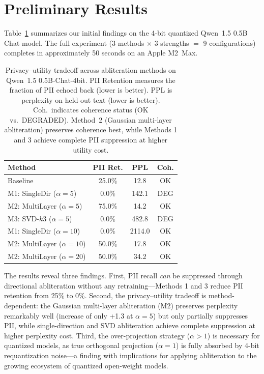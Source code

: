 \documentclass[11pt]{article}
\begin{document}
\section{Preliminary Results}

Table~\ref{tab:results} summarizes our initial findings on the 4-bit quantized Qwen~1.5 0.5B Chat model. The full experiment (3 methods $\times$ 3 strengths $=$ 9 configurations) completes in approximately 50 seconds on an Apple M2~Max.

\begin{table}[t]
\centering
\small
\begin{tabular}{@{}lccc@{}}
\toprule
\textbf{Method} & \textbf{PII Ret.} & \textbf{PPL} & \textbf{Coh.} \\
\midrule
Baseline & 25.0\% & 12.8 & OK \\
\midrule
M1: SingleDir ($\alpha{=}5$) & 0.0\% & 142.1 & DEG \\
M2: MultiLayer ($\alpha{=}5$) & 75.0\% & 14.2 & OK \\
M3: SVD-$k$3 ($\alpha{=}5$) & 0.0\% & 482.8 & DEG \\
\midrule
M1: SingleDir ($\alpha{=}10$) & 0.0\% & 2114.0 & OK \\
M2: MultiLayer ($\alpha{=}10$) & 50.0\% & 17.8 & OK \\
M2: MultiLayer ($\alpha{=}20$) & 50.0\% & 34.2 & OK \\
\bottomrule
\end{tabular}
\caption{Privacy--utility tradeoff across abliteration methods on Qwen~1.5 0.5B-Chat-4bit. PII Retention measures the fraction of PII echoed back (lower is better). PPL is perplexity on held-out text (lower is better). Coh.\ indicates coherence status (OK vs.\ DEGRADED). Method~2 (Gaussian multi-layer abliteration) preserves coherence best, while Methods 1 and 3 achieve complete PII suppression at higher utility cost.}
\label{tab:results}
\end{table}

The results reveal three findings. First, PII recall \textit{can} be suppressed through directional abliteration without any retraining---Methods 1 and 3 reduce PII retention from 25\% to 0\%. Second, the privacy--utility tradeoff is method-dependent: the Gaussian multi-layer abliteration (M2) preserves perplexity remarkably well (increase of only +1.3 at $\alpha{=}5$) but only partially suppresses PII, while single-direction and SVD abliteration achieve complete suppression at higher perplexity cost. Third, the over-projection strategy ($\alpha > 1$) is necessary for quantized models, as true orthogonal projection ($\alpha{=}1$) is fully absorbed by 4-bit requantization noise---a finding with implications for applying abliteration to the growing ecosystem of quantized open-weight models.
\end{document}
